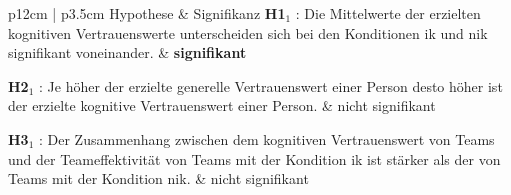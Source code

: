 \documentclass[a4paper,11pt]{article}%
\renewcommand{\\}{\vspace*{0.5\baselineskip} \newline}
\begin{document}
\begin{table}[H]
	\centering\footnotesize{}
	\caption[Signifikanz der Hypothesen]{Signifikanz der Hypothesen}
	\label{SignifikanzOverview}
	\begin{tabularx}{\textwidth}{p{12cm} | p{3.5cm}} 
		Hypothese & Signifikanz  \\
		\hline \\
\textbf{H1$_{1}$} : Die Mittelwerte der erzielten kognitiven Vertrauenswerte unterscheiden sich bei den Konditionen \ac{ik} und \ac{nik} signifikant voneinander.\\
		& \textbf{signifikant} \\
		\hline \\
		
				\textbf{H2$_{1}$} : Je höher der erzielte generelle Vertrauenswert einer Person desto höher ist der erzielte kognitive Vertrauenswert einer Person. \\
		& nicht signifikant \\
		
		\hline 	\\	
%
\textbf{H3$_{1}$} : Der Zusammenhang zwischen dem kognitiven Vertrauenswert von Teams und der Teameffektivität von Teams mit der Kondition \ac{ik} ist stärker als der von Teams mit der Kondition \ac{nik}. \\
		& nicht signifikant \\		
		

\end{tabularx}
\end{table}
\end{document}
